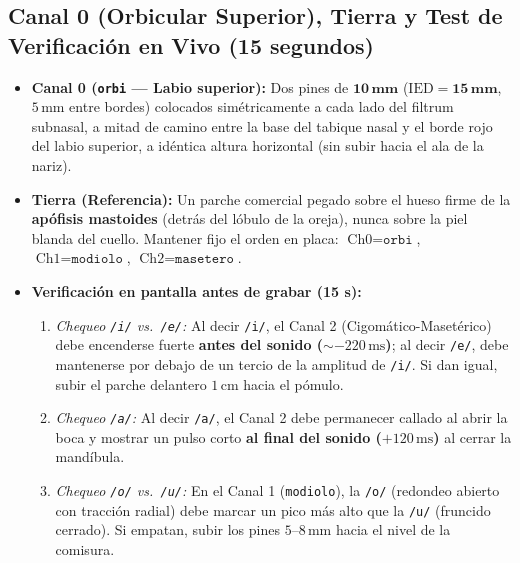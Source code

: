 \documentclass[11pt, a4paper]{article}
\begin{document}
\subsection{Canal 0 (Orbicular Superior), Tierra y Test de Verificación en Vivo (15 segundos)}
\begin{itemize}\setlength{\itemsep}{2pt}
    \item \textbf{Canal 0 (\texttt{orbi} --- Labio superior):} Dos pines de $\mathbf{10\,\text{mm}}$ ($\text{IED} = \mathbf{15\,\text{mm}}$, $5\,\text{mm}$ entre bordes) colocados simétricamente a cada lado del filtrum subnasal, a mitad de camino entre la base del tabique nasal y el borde rojo del labio superior, a idéntica altura horizontal (sin subir hacia el ala de la nariz).
    \item \textbf{Tierra (Referencia):} Un parche comercial pegado sobre el hueso firme de la \textbf{apófisis mastoides} (detrás del lóbulo de la oreja), nunca sobre la piel blanda del cuello. Mantener fijo el orden en placa: $\text{Ch0} = \texttt{orbi}$, $\text{Ch1} = \texttt{modiolo}$, $\text{Ch2} = \texttt{masetero}$.
    \item \textbf{Verificación en pantalla antes de grabar (15 s):}
    \begin{enumerate}\setlength{\itemsep}{1pt}
        \item \textit{Chequeo \texttt{/i/} vs.\ \texttt{/e/}:} Al decir \texttt{/i/}, el Canal 2 (Cigomático-Masetérico) debe encenderse fuerte \textbf{antes del sonido ($\sim -220\,\text{ms}$)}; al decir \texttt{/e/}, debe mantenerse por debajo de un tercio de la amplitud de \texttt{/i/}. Si dan igual, subir el parche delantero $1\,\text{cm}$ hacia el pómulo.
        \item \textit{Chequeo \texttt{/a/}:} Al decir \texttt{/a/}, el Canal 2 debe permanecer callado al abrir la boca y mostrar un pulso corto \textbf{al final del sonido ($+120\,\text{ms}$)} al cerrar la mandíbula.
        \item \textit{Chequeo \texttt{/o/} vs.\ \texttt{/u/}:} En el Canal 1 (\texttt{modiolo}), la \texttt{/o/} (redondeo abierto con tracción radial) debe marcar un pico más alto que la \texttt{/u/} (fruncido cerrado). Si empatan, subir los pines $5\text{--}8\,\text{mm}$ hacia el nivel de la comisura.
    \end{enumerate}
\end{itemize}
\end{document}
